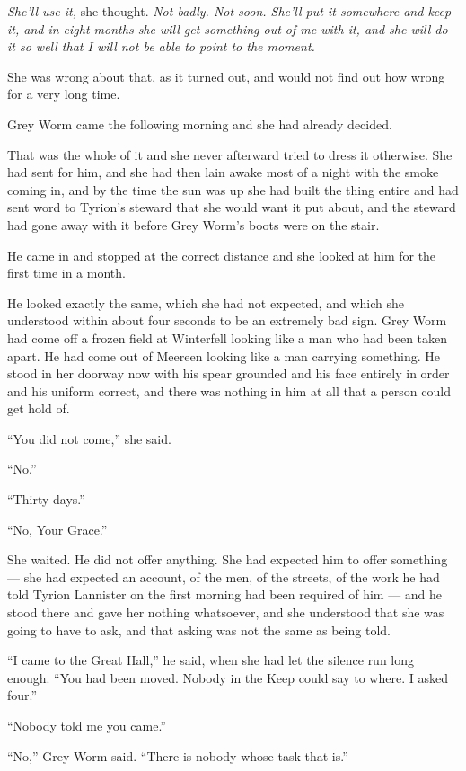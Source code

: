 \textit{She’ll use it,} she thought. \textit{Not badly. Not soon. She’ll put it somewhere and keep it, and in eight months she will get something out of me with it, and she will do it so well that I will not be able to point to the moment.}

She was wrong about that, as it turned out, and would not find out how wrong for a very long time.

\sceneBreak

Grey Worm came the following morning and she had already decided.

That was the whole of it and she never afterward tried to dress it otherwise. She had sent for him, and she had then lain awake most of a night with the smoke coming in, and by the time the sun was up she had built the thing entire and had sent word to Tyrion’s steward that she would want it put about, and the steward had gone away with it before Grey Worm’s boots were on the stair.

He came in and stopped at the correct distance and she looked at him for the first time in a month.

He looked exactly the same, which she had not expected, and which she understood within about four seconds to be an extremely bad sign. Grey Worm had come off a frozen field at Winterfell looking like a man who had been taken apart. He had come out of Meereen looking like a man carrying something. He stood in her doorway now with his spear grounded and his face entirely in order and his uniform correct, and there was nothing in him at all that a person could get hold of.

“You did not come,” she said.

“No.”

“Thirty days.”

“No, Your Grace.”

She waited. He did not offer anything. She had expected him to offer something — she had expected an account, of the men, of the streets, of the work he had told Tyrion Lannister on the first morning had been required of him — and he stood there and gave her nothing whatsoever, and she understood that she was going to have to ask, and that asking was not the same as being told.

“I came to the Great Hall,” he said, when she had let the silence run long enough. “You had been moved. Nobody in the Keep could say to where. I asked four.”

“Nobody told me you came.”

“No,” Grey Worm said. “There is nobody whose task that is.”

